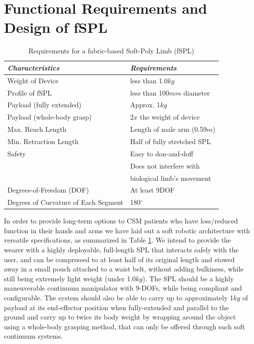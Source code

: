 \documentclass[letterpaper, 10 pt, conference]{ieeeconf}  %
\begin{document}
\section{Functional Requirements and Design of fSPL }
\label{sec:func_req}
\begin{table}[b!]
\caption{Requirements for a fabric-based Soft-Poly Limb (fSPL)} 
\label{tab:spec_table}
	\begin{tabularx}{0.48\textwidth}{*2l}    \toprule\toprule
	\textbf{\emph{Characteristics}} & \textbf{\emph{Requirements}} \\\midrule
	Weight of Device    & less than 1.0$kg$  \\ 
	Profile of fSPL & less than 100$mm$ diameter \\ 
	Payload (fully extended)    & Approx. 1$kg$  \\ 
	Payload (whole-body grasp) & 2$x$ the weight of device \\ 
	Max. Reach Length    & Length of male arm (0.59$m$)  \\ 
	Min. Retraction Length & Half of fully stretched SPL \\ 
	Safety    & Easy to don-and-doff \\ 
	 &Does not interfere with\\
     &biological limb's movement\\
	Degrees-of-Freedom (DOF) & At least 9DOF \\ 
	Degrees of Curvature of Each Segment & 180$^{\circ}$ \\\bottomrule
	 \hline
	\end{tabularx}
\end{table}

In order to provide long-term options to CSM patients who have loss/reduced function in their hands and arms we have laid out a soft robotic architecture with versatile specifications, as summarized in Table \ref{tab:spec_table}. We intend to provide the wearer with a highly deployable, full-length SPL that interacts safely with the user, and can be compressed to at least half of its original length and stowed away in a small pouch attached to a waist belt, without adding bulkiness, while still being extremely light weight (under 1.0$kg$). The SPL should be a highly maneuverable continuum manipulator with 9-DOFs, while being compliant and configurable. The system should also be able to carry up to approximately 1$kg$ of payload at its end-effector position when fully-extended and parallel to the ground and carry up to twice its body weight by wrapping around the object using a whole-body grasping method, that can only be offered through such soft continuum systems. 
% 
% 
% 
% 
\end{document}
